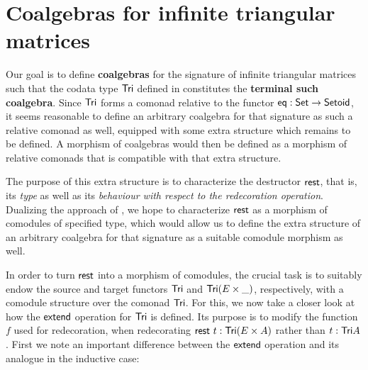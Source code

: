 \documentclass[conference,10pt]{IEEEtran}
\newcommand{\fat}[1]{\textbf{#1}}
\begin{document}
\section{Coalgebras for infinite triangular matrices}\label{sec:coalgebras_for_tri}


Our goal is to define \fat{coalgebras} for the signature of infinite triangular matrices such that 
the codata type $\mathsf{Tri}$ defined in  constitutes the \fat{terminal such coalgebra}.
Since $\mathsf{Tri}$ forms a comonad relative to the functor $\mathsf{eq}:\mathsf{Set}\to\mathsf{Setoid}$, it seems reasonable to define
an arbitrary coalgebra for that signature as such a relative comonad as well, equipped with some extra structure which remains to be defined.
A morphism of coalgebras would then be defined as a morphism of relative comonads that is compatible with that extra structure.

The purpose of this extra structure is to characterize the destructor $\mathsf{rest}$, that is, its \emph{type} as well as
its \emph{behaviour with respect to the redecoration operation}.
Dualizing the approach of \textcite{DBLP:journals/iandc/HirschowitzM10}, we hope to characterize $\mathsf{rest}$ as a morphism of 
comodules of specified type, which would allow us to define the extra structure of an arbitrary coalgebra for that signature
as a suitable comodule morphism as well.

In order to turn $\mathsf{rest}$ into a morphism of comodules, the crucial task is to suitably endow the source and target functors
$\mathsf{Tri}$ and $\mathsf{Tri}(E\times \_)$, respectively, with a comodule structure over the comonad $\mathsf{Tri}$.
For this, we now take a closer look at how the $\mathsf{extend}$ operation for $\mathsf{Tri}$ is defined. Its purpose is to 
modify the function $f$ used for redecoration, when redecorating $\mathsf{rest}~t : \mathsf{Tri}(E\times A)$ rather than $t : \mathsf{Tri} A$.
First we note an important difference between the $\mathsf{extend}$ operation and its analogue in the inductive case:
\end{document}

